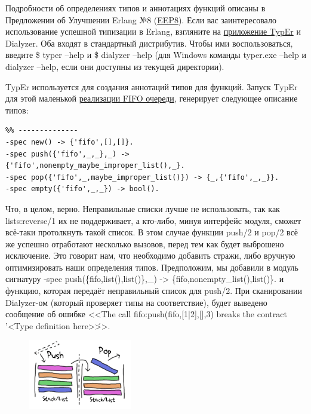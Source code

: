 \documentclass[a4paper,12pt]{report}
\newcommand{\ops}{\colorbox{lgreen}}
\begin{document}
Подробности об определениях типов и аннотациях функций описаны в Предложении об Улучшении Erlang №8 (\href{http://www.erlang.org/eeps/eep-0008.html}{EEP8}). Если вас заинтересовало использование успешной типизации в Erlang, взгляните на \href{http://user.it.uu.se/~tobiasl/publications/typer.pdf}{приложение TypEr} и Dialyzer. Оба входят в стандартный дистрибутив. Чтобы ими воспользоваться, введите \ops{\$ typer --help} и \ops{\$ dialyzer --help} (для Windows команды \ops{typer.exe --help} и \ops{dialyzer --help}, если они доступны из текущей директории).

TypEr используется для создания аннотаций типов для функций. Запуск TypEr для этой маленькой \href{http://learnyousomeerlang.com/static/erlang/fifo.erl}{реализации FIFO очереди}, генерирует следующее описание типов:
\begin{lstlisting}[style=erlang]
%% File: fifo.erl
%% --------------
-spec new() -> {'fifo',[],[]}.
-spec push({'fifo',_,_},_) -> {'fifo',nonempty_maybe_improper_list(),_}.
-spec pop({'fifo',_,maybe_improper_list()}) -> {_,{'fifo',_,_}}.
-spec empty({'fifo',_,_}) -> bool().
\end{lstlisting}

Что, в целом, верно. Неправильные списки лучше не использовать, так как \ops{lists:reverse/1} их не поддерживает, а кто\--либо, минуя интерфейс модуля, сможет всё\--таки протолкнуть такой список. В этом случае функции \ops{push/2} и \ops{pop/2} всё же успешно отработают несколько вызовов, перед тем как будет выброшено исключение. Это говорит нам, что необходимо добавить стражи, либо вручную оптимизировать наши определения типов. Предположим, мы добавили в модуль сигнатуру \ops{-spec push(\{fifo,list(),list()\},\_) -> \{fifo,nonempty\_list(),list()\}.} и функцию, которая передаёт неправильный список для \ops{push/2}. При сканировании Dialyzer\--ом (который проверяет типы на соответствие), будет выведено сообщение об ошибке <<The call fifo:push({fifo,[1|2],[]},3) breaks the contract '<Type definition here>\'>>.
\begin{figure}[h!]
    \includegraphics[width=0.4\textwidth]{fifo.png}
\end{figure} 
\end{document}
